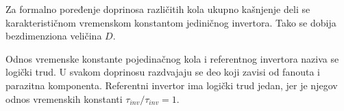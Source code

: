 Za formalno poređenje doprinosa različitih kola ukupno kašnjenje deli se karakterističnom vremenskom konstantom jediničnog invertora. Tako se dobija bezdimenziona veličina $D$.

Odnos vremenske konstante pojedinačnog kola i referentnog invertora naziva se logički trud. U svakom doprinosu razdvajaju se deo koji zavisi od fanouta i parazitna komponenta. Referentni invertor ima logički trud jedan, jer je njegov odnos vremenskih konstanti $\tau_{inv}/\tau_{inv}=1$.

